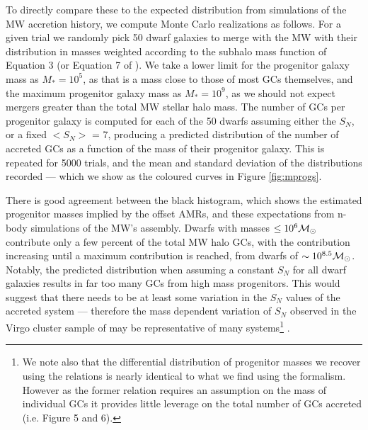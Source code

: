 \documentclass[useAMS,usenatbib]{mn2e}
\newcommand\msol{{{\cal M}_\odot}}
\begin{document}
To directly compare these to the expected distribution from
simulations of the MW accretion history, we compute Monte Carlo realizations
as follows.  For a given trial we randomly pick 50 dwarf galaxies to merge 
with the MW with their distribution in masses weighted according to the 
subhalo mass function of Equation 3 (or Equation 7 of \cite{BK10}).
We take a lower limit for the progenitor galaxy mass as $M_{*} = 10^{5}$,
as that is a mass close to those of most GCs themselves, and the maximum progenitor
galaxy mass as $M_{*} = 10^{9}$, as we should not expect mergers greater than
the total MW stellar halo mass.  
The number of GCs per progenitor galaxy is computed for 
each of the 50 dwarfs assuming either the 
\cite{Peng08} $S_{N}$, or a fixed $<S_{N}>$ = 7, producing a predicted
distribution of the number of accreted GCs as a function of 
the mass of their progenitor galaxy.  This is repeated for 5000 trials,
and the mean and standard deviation of the distributions recorded --- which 
we show as the coloured curves in Figure \ref{fig:mprogs}.  

There is good agreement between the black histogram,
which shows the estimated progenitor masses
implied by the offset AMRs, and these
expectations from n-body simulations of the MW's assembly.  Dwarfs with
masses $\leq 10^{6} \msol$ contribute only a few percent of the total MW halo GCs,
with the contribution increasing until a maximum contribution is
reached, from  dwarfs of $\sim 10^{8.5} \msol$.  Notably, the 
predicted distribution when assuming a constant $S_{N}$ for all dwarf galaxies
results in far too many GCs from high mass progenitors.  This would suggest
that there needs to be at least some variation in the $S_{N}$ values of
the accreted system --- therefore the mass dependent variation of $S_{N}$ 
observed in the Virgo cluster sample of \cite{Peng08} may be representative
of many systems\footnote{We note also that the differential distribution of 
progenitor masses we recover using the \cite{Spitler09} relations is nearly identical
to what we find using the \cite{Peng08} formalism. However as the former
relation requires an assumption on the mass of individual GCs it provides
little leverage on the total number of GCs accreted (i.e. Figure 5 and 6).}
.  
\end{document}
